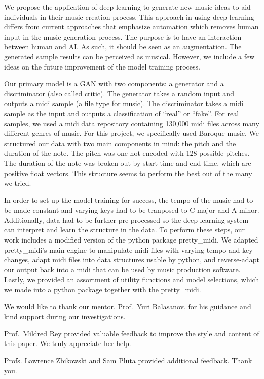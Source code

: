\documentclass[12pt,oneside]{chicagocapstone}
\begin{document}
  \begin{executive}
    We propose the application of deep learning to generate new music ideas to aid individuals in their music creation process. This approach in using deep learning differs from current approaches that emphasize automation which removes human input in the music generation process. The purpose is to have an interaction between human and AI. As such, it should be seen as an augmentation. The generated sample results can be perceived as musical. However, we include a few ideas on the future improvement of the model training process.
    
    Our primary model is a GAN with two components: a generator and a discriminator (also called critic). The generator takes a random input and outputs a midi sample (a file type for music). The discriminator takes a midi sample as the input and outputs a classification of ``real'' or ``fake''. For real samples, we used a midi data repository containing 130,000 midi files across many different genres of music. For this project, we specifically used Baroque music. We structured our data with two main components in mind: the pitch and the duration of the note. The pitch was one-hot encoded with 128 possible pitches. The duration of the note was broken out by start time and end time, which are positive float vectors. This structure seems to perform the best out of the many we tried.
    
    In order to set up the model training for success, the tempo of the music had to be made constant and varying keys had to be tranposed to C major and A minor. Additionally, data had to be further pre-processed so the deep learning system can interpret and learn the structure in the data. To perform these steps, our work includes a modified version of the python package pretty\_midi. We adapted pretty\_midi's main engine to manipulate midi files with varying tempo and key changes, adapt midi files into data structures usable by python, and reverse-adapt our output back into a midi that can be used by music production software. Lastly, we provided an assortment of utility functions and model selections, which we made into a python package together with the pretty\_midi.
    
    \bigskip
    \bigskip
    \bigskip
  \end{executive}

  \begin{acknowledgements}
    We would like to thank our mentor, Prof.~Yuri Balasanov, for his guidance and kind support during our investigations.
    
    Prof.~Mildred Rey provided valuable feedback to improve the style and content of this paper. We truly appreciate her help.
    
    Profs. Lawrence Zbikowski and Sam Pluta provided additional feedback. Thank you.
  \end{acknowledgements}
\end{document}
